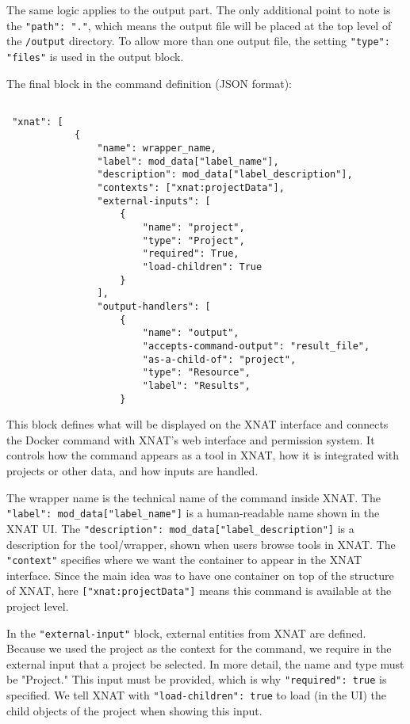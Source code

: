 The same logic applies to the output part. The only additional point to note is the \texttt{"path": "."}, which means the output file will be placed at the top level of the \texttt{/output} directory. To allow more than one output file, the setting \texttt{"type": "files"} is used in the output block.

The final block in the command definition (JSON format):

\begin{lstlisting}

 "xnat": [
            {
                "name": wrapper_name,
                "label": mod_data["label_name"],
                "description": mod_data["label_description"],
                "contexts": ["xnat:projectData"],  
                "external-inputs": [
                    { 
                        "name": "project",
                        "type": "Project",
                        "required": True,
                        "load-children": True
                    }
                ],
                "output-handlers": [
                    {
                        "name": "output",
                        "accepts-command-output": "result_file",
                        "as-a-child-of": "project",
                        "type": "Resource",
                        "label": "Results",
                    }
\end{lstlisting}

This block defines what will be displayed on the XNAT interface and connects the Docker command with XNAT's web interface and permission system. It controls how the command appears as a tool in XNAT, how it is integrated with projects or other data, and how inputs are handled.

The wrapper name is the technical name of the command inside XNAT. The \texttt{"label": mod\_data["label\_name"]} is a human-readable name shown in the XNAT \ac{UI}. The \texttt{"description": mod\_data["label\_description"]} is a description for the tool/wrapper, shown when users browse tools in XNAT. The \texttt{"context"} specifies where we want the container to appear in the XNAT interface. Since the main idea was to have one container on top of the structure of XNAT, here \texttt{["xnat:projectData"]} means this command is available at the project level.


In the \texttt{"external-input"} block, external entities from XNAT are defined. Because we used the project as the context for the command, we require in the external input that a project be selected. In more detail, the name and type must be "Project." This input must be provided, which is why \texttt{"required": true} is specified. We tell XNAT with \texttt{"load-children": true} to load (in the UI) the child objects of the project when showing this input.

